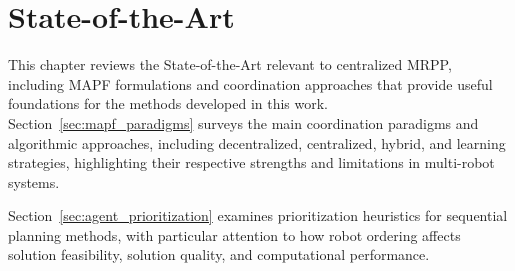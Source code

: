 \chapter{State-of-the-Art} \label{chap:ch3}
\hspace{\parindent}
This chapter reviews the State-of-the-Art relevant to centralized MRPP, including MAPF formulations
and coordination approaches that provide useful foundations for the methods developed in this work.
Section~\ref{sec:mapf_paradigms} surveys the main coordination paradigms and algorithmic
approaches, including decentralized, centralized, hybrid, and learning strategies, highlighting
their respective strengths and limitations in multi-robot systems.

Section~\ref{sec:agent_prioritization} examines prioritization heuristics for sequential planning
methods, with particular attention to how robot ordering affects solution feasibility, solution
quality, and computational performance.

